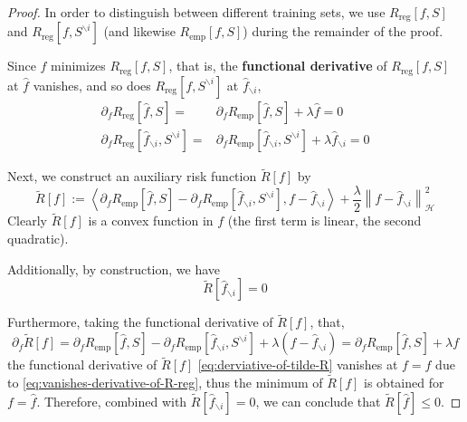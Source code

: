 \begin{proof}
	In order to distinguish between different training sets, we use $R_{\text{reg}}[f,S]$ and $R_{\text{reg}}[f,S^{\backslash i}]$ (and likewise $R_{\text{emp}}[f,S]$) during the remainder of the proof.

	Since $\hat{f}$ minimizes $R_{\text{reg}}[f,S]$, that is, the \textbf{functional derivative} \cite{stephane_canu_lecture_2014} of $R_{\text{reg}}[f,S]$ at $\hat{f}$ vanishes, and so does $R_{\text{reg}}[f,S^{\backslash i}]$ at $\hat{f}_{\backslash i}$,
	\begin{equation}
		\label{eq:vanishes-derivative-of-R-reg}
		\begin{aligned}
			\partial_{f}R_{\text{reg}}\left[\hat{f},S\right]=                               & \partial_{f}R_{\text{emp}}\left[\hat{f},S\right]+\lambda\hat{f}=0                                              \\
			\partial_{f}R_{\text{reg}}\left[\hat{f}_{\backslash i},S^{\backslash i}\right]= & \partial_{f}R_{\text{emp}}\left[\hat{f}_{\backslash i},S^{\backslash i}\right]+\lambda\hat{f}_{\backslash i}=0
		\end{aligned}
	\end{equation}

	Next, we construct an auxiliary risk function $\tilde{R}[f]$ by
	\begin{equation}
		\tilde{R}[f]:=\left\langle\partial_{f}R_{\text{emp}}\left[\hat{f},S\right]-\partial_{f}R_{\text{emp}}\left[\hat{f}_{\backslash i},S^{\backslash i}\right],f-\hat{f}_{\backslash i}\right\rangle+\frac{\lambda}{2}\left\|f-\hat{f}_{\backslash i}\right\|_{\mathcal{H}}^{2}
	\end{equation}
	Clearly $\tilde{R}[f]$ is a convex function in $f$ (the first term is linear, the second quadratic).

	Additionally, by construction, we have
	\begin{equation}
		\tilde{R}[\hat{f}_{\backslash i}]=0
	\end{equation}

	Furthermore, taking the functional derivative of $\tilde{R}[f]$, that,
	\begin{equation}
		\label{eq:derviative-of-tilde-R}
		\partial_{f}\tilde{R}[f]=\partial_{f}R_{\text{emp}}\left[\hat{f},S\right]-\partial_{f}R_{\text{emp}}\left[\hat{f}_{\backslash i},S^{\backslash i}\right]+\lambda\left(f-\hat{f}_{\backslash i}\right)=\partial_{f}R_{\text{emp}}\left[\hat{f},S\right]+\lambda f
	\end{equation}
	the functional derivative of $\tilde{R}[f]$ \eqref{eq:derviative-of-tilde-R} vanishes at $f=\hat{f}$ due to \eqref{eq:vanishes-derivative-of-R-reg}, thus the minimum of $\tilde{R}[f]$ is obtained for $f=\hat{f}$. Therefore, combined with $\tilde{R}[\hat{f}_{\backslash i}]=0$, we can conclude that $\tilde{R}[\hat{f}]\leq 0$.


\end{proof}
